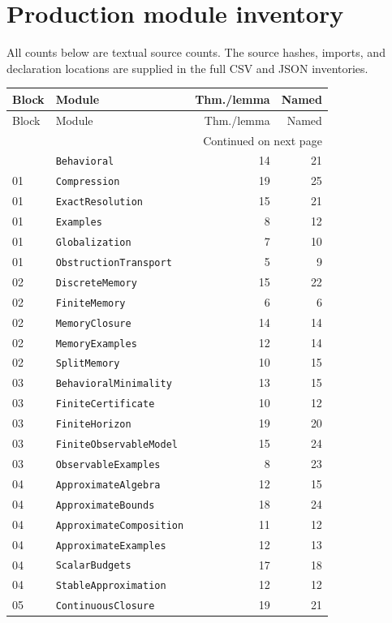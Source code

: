 \documentclass[11pt]{article}
\begin{document}
\section{Production module inventory}
All counts below are textual source counts. The source hashes, imports, and declaration locations are supplied in the full CSV and JSON inventories.
\begingroup\small
\begin{longtable}{@{}p{.62in}p{3.50in}rr@{}}
\toprule Block & Module & Thm./lemma & Named\\\midrule\endfirsthead
\toprule Block & Module & Thm./lemma & Named\\\midrule\endhead
\midrule\multicolumn{4}{r}{Continued on next page}\\\endfoot
\bottomrule\endlastfoot
01 & \texttt{Behavioral} & 14 & 21\\
01 & \texttt{Compression} & 19 & 25\\
01 & \texttt{ExactResolution} & 15 & 21\\
01 & \texttt{Examples} & 8 & 12\\
01 & \texttt{Globalization} & 7 & 10\\
01 & \texttt{ObstructionTransport} & 5 & 9\\
02 & \texttt{DiscreteMemory} & 15 & 22\\
02 & \texttt{FiniteMemory} & 6 & 6\\
02 & \texttt{MemoryClosure} & 14 & 14\\
02 & \texttt{MemoryExamples} & 12 & 14\\
02 & \texttt{SplitMemory} & 10 & 15\\
03 & \texttt{BehavioralMinimality} & 13 & 15\\
03 & \texttt{FiniteCertificate} & 10 & 12\\
03 & \texttt{FiniteHorizon} & 19 & 20\\
03 & \texttt{FiniteObservableModel} & 15 & 24\\
03 & \texttt{ObservableExamples} & 8 & 23\\
04 & \texttt{ApproximateAlgebra} & 12 & 15\\
04 & \texttt{ApproximateBounds} & 18 & 24\\
04 & \texttt{ApproximateComposition} & 11 & 12\\
04 & \texttt{ApproximateExamples} & 12 & 13\\
04 & \texttt{ScalarBudgets} & 17 & 18\\
04 & \texttt{StableApproximation} & 12 & 12\\
05 & \texttt{ContinuousClosure} & 19 & 21\\

\end{longtable}
\end{document}
